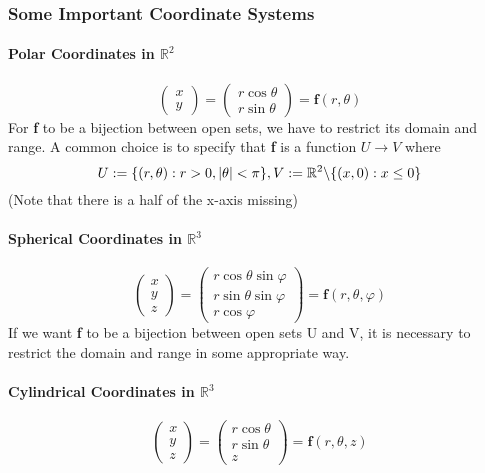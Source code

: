 \documentclass[11pt]{article}
\newcommand{\tb}[1]{\textbf{#1}}
\newcommand{\real}[0]{\mathbb{R}}
\begin{document}
\subsubsection{Some Important Coordinate Systems}
\paragraph{Polar Coordinates in $\real^2$}
$$\begin{pmatrix}
    x\\y
\end{pmatrix}
= \begin{pmatrix}
    r\cos{\theta}\\
    r\sin{\theta}
\end{pmatrix}
= \tb{f}(r, \theta) $$
For \tb{f} to be a bijection between open sets, we have to restrict its domain and range. A common choice is to specify that \tb{f} is a function $U \rightarrow V$ where
$$U := \{(r, \theta): r > 0, |\theta| < \pi\},   V:= \real^2 \symbol{92}\{(x, 0): x \leq 0 \}$$
(Note that there is a half of the x-axis missing)
\paragraph{Spherical Coordinates in $\real^3$}
$$\begin{pmatrix}
    x\\y\\z
\end{pmatrix}
= \begin{pmatrix}
    r\cos{\theta}\sin{\varphi}\\
    r\sin{\theta}\sin{\varphi}\\
    r\cos{\varphi}
\end{pmatrix}
= \tb{f}(r, \theta, \varphi)$$
If we want \tb{f} to be a bijection between open sets U and V, it is necessary to restrict the domain and range in some appropriate way.

\paragraph{Cylindrical Coordinates in $\real^3$}
$$\begin{pmatrix}
    x\\y\\z
\end{pmatrix}
= \begin{pmatrix}
    r\cos{\theta}\\
    r\sin{\theta}\\
    z
\end{pmatrix}
= \tb{f}(r, \theta, z)$$
\end{document}
